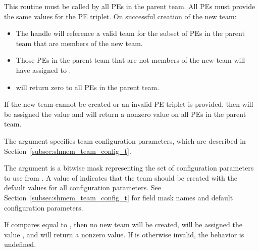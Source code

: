 \begin{apidefinition}
{This routine must be called by all \acp{PE} in the parent team.
All \acp{PE} must provide the same values for the \ac{PE} triplet.
On successful creation of the new team:

\begin{itemize}
\item The  handle will reference a valid team for the
  subset of \acp{PE} in the parent team that are members of the new team.
\item Those \acp{PE} in the parent team that are not members of the new team
  will have  assigned to .
\item {} will return zero to all
  \acp{PE} in the parent team.
\end{itemize}

If the new team cannot be created or an invalid \ac{PE} triplet is provided,
then  will be assigned the value  and
 will return a nonzero value on all
\acp{PE} in the parent team.

The  argument specifies team configuration parameters, which are
described in Section~\ref{subsec:shmem_team_config_t}.

The  argument is a bitwise mask representing the set of
configuration parameters to use from .
A  value of  indicates that the team
should be created with the default values for all configuration parameters.
See Section~\ref{subsec:shmem_team_config_t} for field mask names and
default configuration parameters.

If 
compares equal to , then no new team
will be created,  will be assigned the value
, and  will
return a nonzero value.  If  is otherwise invalid, the
behavior is undefined.
}




\end{apidefinition}
